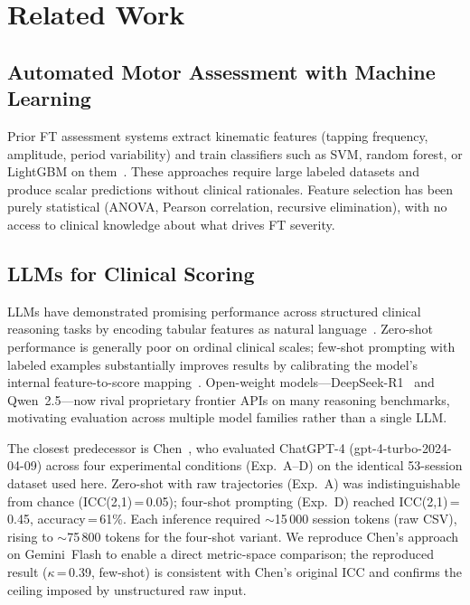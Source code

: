 \documentclass[conference]{IEEEtran}
\begin{document}
\section{Related Work}

\subsection{Automated Motor Assessment with Machine Learning}
Prior FT assessment systems extract kinematic features (tapping frequency, amplitude,
period variability) and train classifiers such as SVM, random forest, or LightGBM on
them~\cite{cite_ml_motor,cite_ml_motor2,yang2024deep}.
These approaches require large labeled datasets and produce scalar predictions without
clinical rationales.
Feature selection has been purely statistical (ANOVA, Pearson correlation, recursive
elimination), with no access to clinical knowledge about what drives FT severity.

\subsection{LLMs for Clinical Scoring}
LLMs have demonstrated promising performance across structured clinical reasoning tasks
by encoding tabular features as natural language~\cite{cite_gpt4clinical}.
Zero-shot performance is generally poor on ordinal clinical scales; few-shot prompting
with labeled examples substantially improves results by calibrating the model's internal
feature-to-score mapping~\cite{cite_fewshot}.
Open-weight models---DeepSeek-R1~\cite{DeepSeek2025R1} and Qwen~2.5---now rival
proprietary frontier APIs on many reasoning benchmarks, motivating evaluation across
multiple model families rather than a single LLM.

The closest predecessor is Chen~\cite{chen2024chatgpt}, who evaluated ChatGPT-4
(gpt-4-turbo-2024-04-09) across four experimental conditions (Exp.~A--D) on the
identical 53-session dataset used here.
Zero-shot with raw trajectories (Exp.~A) was indistinguishable from chance
(ICC(2,1)\,=\,0.05); four-shot prompting (Exp.~D) reached ICC(2,1)\,=\,0.45,
accuracy\,=\,61\%.
Each inference required $\sim$15\,000 session tokens (raw CSV), rising to
$\sim$75\,800 tokens for the four-shot variant.
We reproduce Chen's approach on Gemini~Flash to enable a direct metric-space
comparison; the reproduced result ($\kappa$\,=\,0.39, few-shot) is consistent with
Chen's original ICC and confirms the ceiling imposed by unstructured raw input.
\end{document}
